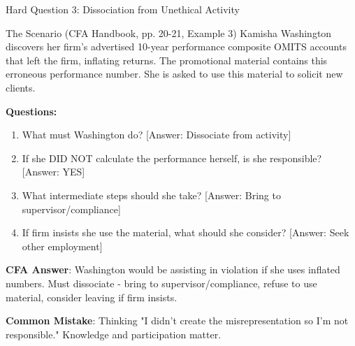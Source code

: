 \documentclass{beamer}
\begin{document}
	\begin{frame}{Hard Question 3: Dissociation from Unethical Activity}
		\begin{block}{The Scenario (CFA Handbook, pp. 20-21, Example 3)}
			Kamisha Washington discovers her firm's advertised 10-year performance composite OMITS accounts that left the firm, inflating returns. The promotional material contains this erroneous performance number. She is asked to use this material to solicit new clients.
		\end{block}
		
		\vspace{0.2cm}
		\textbf{Questions:}
		\begin{enumerate}
			\item What must Washington do? \textcolor{cfared}{[Answer: Dissociate from activity]}
			\item If she DID NOT calculate the performance herself, is she responsible? \textcolor{cfared}{[Answer: YES]}
			\item What intermediate steps should she take? \textcolor{cfared}{[Answer: Bring to supervisor/compliance]}
			\item If firm insists she use the material, what should she consider? \textcolor{cfared}{[Answer: Seek other employment]}
		\end{enumerate}
		
		\vspace{0.2cm}
		\textcolor{cfablue}{\textbf{CFA Answer}}: Washington would be assisting in violation if she uses inflated numbers. Must dissociate - bring to supervisor/compliance, refuse to use material, consider leaving if firm insists.
		
		\vspace{0.1cm}
		\textcolor{cfared}{\textbf{Common Mistake}}: Thinking "I didn't create the misrepresentation so I'm not responsible." Knowledge and participation matter.
	\end{frame}
	
\end{document}
